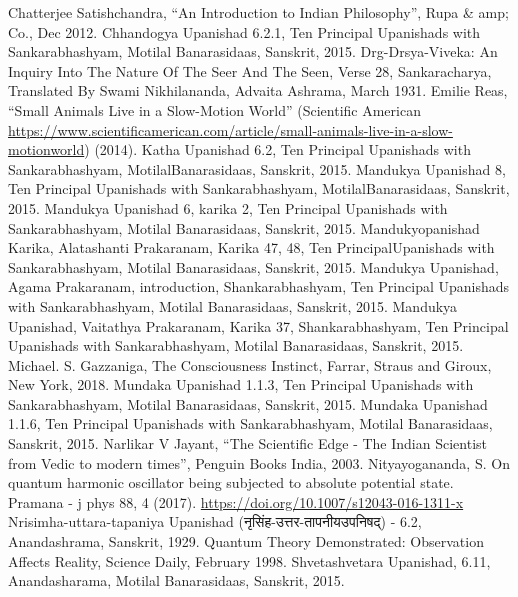 \documentclass[twoside, 13pt]{article}
\begin{document}
{{{\begin{thebibliography}{99}
\newpage
\bibitem{} Chatterjee Satishchandra, “An Introduction to Indian Philosophy”, Rupa \& amp; Co., Dec 2012.
\bibitem{} Chhandogya Upanishad 6.2.1, Ten Principal Upanishads with Sankarabhashyam, Motilal Banarasidaas, Sanskrit, 2015.
\bibitem{} Drg-Drsya-Viveka: An Inquiry Into The Nature Of The Seer And The Seen, Verse 28, Sankaracharya, Translated By Swami Nikhilananda, Advaita Ashrama, March 1931.
\bibitem{} Emilie Reas, “Small Animals Live in a Slow-Motion World” (Scientiﬁc American\break 
\url{https://www.scientiﬁcamerican.com/article/small-animals-live-in-a-slow-motionworld}) (2014).
\bibitem{} Katha Upanishad 6.2, Ten Principal Upanishads with Sankarabhashyam, Motilal\break Banarasidaas, Sanskrit, 2015.
\bibitem{} Mandukya Upanishad 8, Ten Principal Upanishads with Sankarabhashyam, Motilal\break Banarasidaas, Sanskrit, 2015.
\bibitem{} Mandukya Upanishad 6, karika 2, Ten Principal Upanishads with Sankarabhashyam, Motilal Banarasidaas, Sanskrit, 2015.
\bibitem{} Mandukyopanishad Karika, Alatashanti Prakaranam, Karika 47, 48, Ten Principal\break Upanishads with Sankarabhashyam, Motilal Banarasidaas, Sanskrit, 2015.
\bibitem{} Mandukya Upanishad, Agama Prakaranam, introduction, Shankarabhashyam, Ten Principal Upanishads with Sankarabhashyam, Motilal Banarasidaas, Sanskrit, 2015.
\bibitem{} Mandukya Upanishad, Vaitathya Prakaranam, Karika 37, Shankarabhashyam, Ten Principal Upanishads with Sankarabhashyam, Motilal Banarasidaas, Sanskrit, 2015.
\bibitem{} Michael. S. Gazzaniga, The Consciousness Instinct, Farrar, Straus and Giroux, New York, 2018.
\bibitem{} Mundaka Upanishad 1.1.3, Ten Principal Upanishads with Sankarabhashyam, Motilal Banarasidaas, Sanskrit, 2015.
\bibitem{} Mundaka Upanishad 1.1.6, Ten Principal Upanishads with Sankarabhashyam, Motilal Banarasidaas, Sanskrit, 2015.
\bibitem{} Narlikar V Jayant, “The Scientific Edge - The Indian Scientist from Vedic to modern times”, Penguin Books India, 2003.
\bibitem{} Nityayogananda, S. On quantum harmonic oscillator being subjected to absolute potential state. Pramana - j phys 88, 4 (2017). \url{https://doi.org/10.1007/s12043-016-1311-x}
\bibitem{} Nrisimha-uttara-tapaniya Upanishad (\foreignlanguage{hindi}{{\fontsize{9}{11}\selectfont नृसिंह-उत्तर-तापनीयउपनिषद्}}) - 6.2, Anandashrama, Sanskrit, 1929.
\bibitem{} Quantum Theory Demonstrated: Observation Affects Reality, Science Daily, February 1998.
\bibitem{} Shvetashvetara Upanishad, 6.11, Anandasharama, Motilal Banarasidaas, Sanskrit, 2015.


\end{thebibliography}}}}
\end{document}
